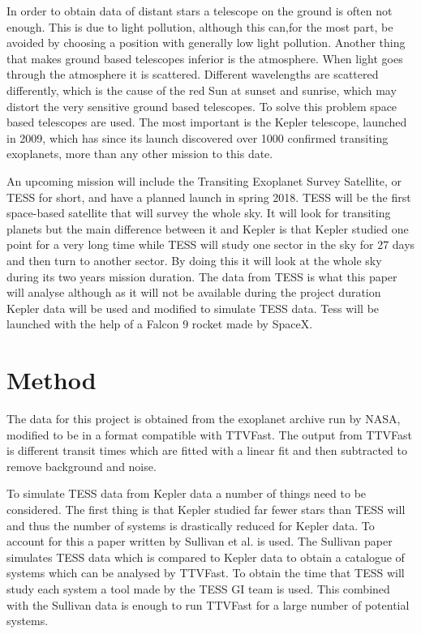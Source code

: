 \documentclass[titlepage]{article}
\begin{document}
	In order to obtain data of distant stars a telescope on the ground is often not enough. This is due to light pollution, although this can,for the most part, be avoided by choosing a position with generally low light pollution. Another thing that makes ground based telescopes inferior is the atmosphere. When light goes through the atmosphere it is scattered. Different wavelengths are scattered differently, which is the cause of the red Sun at sunset and sunrise, which may distort the very sensitive ground based telescopes. To solve this problem space based telescopes are used. The most important is the Kepler telescope, launched in 2009, which has since its launch discovered over 1000 confirmed transiting exoplanets, more than any other mission to this date. \nocite{3}
	
	An upcoming mission will include the Transiting Exoplanet Survey Satellite, or TESS for short, and have a planned launch in spring 2018. TESS will be the first space-based satellite that will survey the whole sky. It will look for transiting planets but the main difference between it and Kepler is that Kepler studied one point for a very long time while TESS will study one sector in the sky for 27 days and then turn to another sector. By doing this it will look at the whole sky during its two years mission duration. The data from TESS is what this paper will analyse although as it will not be available during the project duration Kepler data will be used and modified to simulate TESS data. Tess will be launched with the help of a Falcon 9 rocket made by SpaceX. \nocite{TESS}
	
	
	
\section{Method}
	The data for this project is obtained from the exoplanet archive run by NASA, modified to be in a format compatible with TTVFast. The output from TTVFast is different transit times which are fitted with a linear fit and then subtracted to remove background and noise. 
	
	To simulate TESS data from Kepler data a number of things need to be considered. The first thing is that Kepler studied far fewer stars than TESS will and thus the number of systems is drastically reduced for Kepler data. To account for this a paper written by Sullivan et al. \nocite{4} is used. The Sullivan paper simulates TESS data which is compared to Kepler data to obtain a catalogue of systems which can be analysed by TTVFast. To obtain the time that TESS will study each system a tool made by the TESS GI team \nocite{5} is used. This combined with the Sullivan data is enough to run TTVFast for a large number of potential systems.
	
\end{document}
